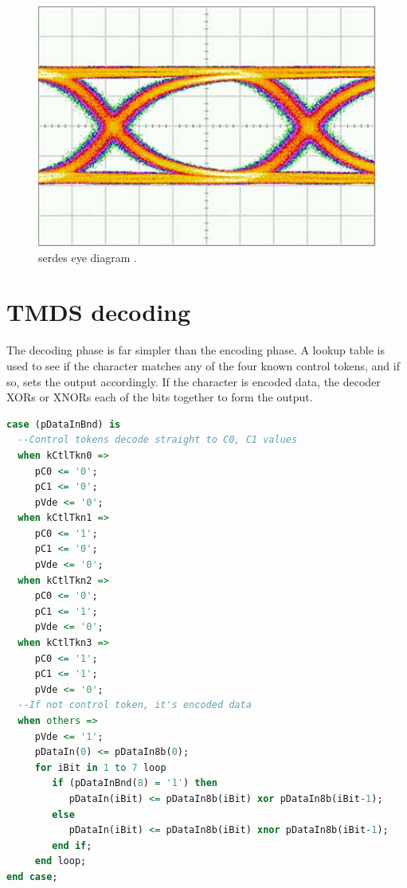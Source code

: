 \begin{figure}
  \centering
  \includegraphics[width=1\textwidth]{./img/eye_diagram.jpg}
  \caption{\gls{serdes} eye diagram \cite{eye_diagram}.}
  \label{fig:eye_diagram}
\end{figure}

\section{TMDS decoding}

The decoding phase is far simpler than the encoding phase. A lookup table is used to see if the character matches any of the four known control tokens, and if so, sets the output accordingly. If the character is encoded data, the decoder XORs or XNORs each of the bits together to form the output.

\begin{lstlisting}[caption={TMDS decoding logic.}, label={lst:tmds_decode}, language=VHDL]
case (pDataInBnd) is
  --Control tokens decode straight to C0, C1 values
  when kCtlTkn0 =>
     pC0 <= '0';
     pC1 <= '0';
     pVde <= '0';
  when kCtlTkn1 =>
     pC0 <= '1';
     pC1 <= '0';
     pVde <= '0';               
  when kCtlTkn2 =>
     pC0 <= '0';
     pC1 <= '1';
     pVde <= '0';
  when kCtlTkn3 =>
     pC0 <= '1';
     pC1 <= '1';
     pVde <= '0';
  --If not control token, it's encoded data
  when others =>
     pVde <= '1'; 
     pDataIn(0) <= pDataIn8b(0);
     for iBit in 1 to 7 loop
        if (pDataInBnd(8) = '1') then
           pDataIn(iBit) <= pDataIn8b(iBit) xor pDataIn8b(iBit-1);
        else
           pDataIn(iBit) <= pDataIn8b(iBit) xnor pDataIn8b(iBit-1);
        end if;
     end loop;                           
end case;
\end{lstlisting}
